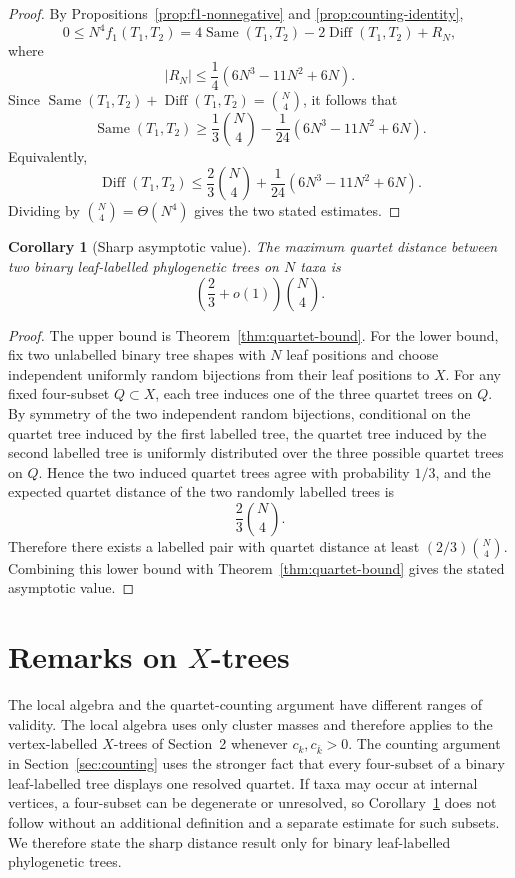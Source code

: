 \documentclass[11pt]{article}
\newtheorem{corollary}[theorem]{Corollary}
\newcommand{\Same}{\operatorname{Same}}
\newcommand{\Diff}{\operatorname{Diff}}
\begin{document}
\begin{proof}
By Propositions~\ref{prop:f1-nonnegative} and
\ref{prop:counting-identity},
\[
0\le N^4f_1(T_1,T_2)
=4\Same(T_1,T_2)-2\Diff(T_1,T_2)+R_N,
\]
where
\[
|R_N|\le\frac14(6N^3-11N^2+6N).
\]
Since $\Same(T_1,T_2)+\Diff(T_1,T_2)=\binom N4$, it follows that
\[
\Same(T_1,T_2)
\ge \frac13\binom N4-\frac1{24}(6N^3-11N^2+6N).
\]
Equivalently,
\[
\Diff(T_1,T_2)
\le \frac23\binom N4+\frac1{24}(6N^3-11N^2+6N).
\]
Dividing by $\binom N4=\Theta(N^4)$ gives the two stated estimates.
\end{proof}


\begin{corollary}[Sharp asymptotic value]\label{cor:sharpness}
The maximum quartet distance between two binary leaf-labelled phylogenetic trees on $N$ taxa is
\[
\left(\frac23+o(1)\right)\binom N4.
\]
\end{corollary}

\begin{proof}
The upper bound is Theorem~\ref{thm:quartet-bound}.  For the lower bound, fix two unlabelled binary tree shapes with $N$ leaf positions and choose independent uniformly random bijections from their leaf positions to $X$.  For any fixed four-subset $Q\subset X$, each tree induces one of the three quartet trees on $Q$.  By symmetry of the two independent random bijections, conditional on the quartet tree induced by the first labelled tree, the quartet tree induced by the second labelled tree is uniformly distributed over the three possible quartet trees on $Q$.  Hence the two induced quartet trees agree with probability $1/3$, and the expected quartet distance of the two randomly labelled trees is
\[
\frac23\binom N4.
\]
Therefore there exists a labelled pair with quartet distance at least $(2/3)\binom N4$.  Combining this lower bound with Theorem~\ref{thm:quartet-bound} gives the stated asymptotic value.
\end{proof}
\section[Remarks on X-trees]{Remarks on $X$-trees}

The local algebra and the quartet-counting argument have different ranges of
validity.  The local algebra uses only cluster masses and therefore applies to
the vertex-labelled $X$-trees of Section~2 whenever $c_k,c_{\bar k}>0$.
The counting argument in Section~\ref{sec:counting} uses the stronger fact
that every four-subset of a binary leaf-labelled tree displays one resolved
quartet.  If taxa may occur at internal vertices, a four-subset can be
degenerate or unresolved, so Corollary~\ref{cor:sharpness} does not follow
without an additional definition and a separate estimate for such subsets.
We therefore state the sharp distance result only for binary leaf-labelled
phylogenetic trees.
\end{document}
